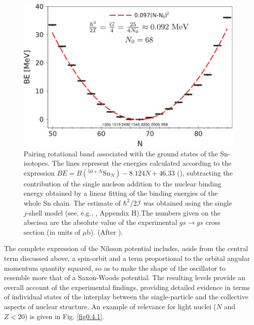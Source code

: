 \documentclass[a4paper,11pt]{book}
\numberwithin{equation}{section}
\numberwithin{figure}{section}
\numberwithin{table}{section}
\begin{document}
\begin{figure}
	\centerline {
		\includegraphics*[width=12cm, angle=0.]{introduccion/figs/fig0_4_5_v2}
	}
	\caption{Pairing rotational band associated with the ground states of the Sn-isotopes. The lines represent the energies calculated according to the expression $BE = B( ^{50+N}\text{Sn}_N ) - 8.124N + 46.33$ (\cite{Brink:05}), subtracting the contribution of the single nucleon addition to the nuclear binding		energy obtained by a linear fitting of the binding energies of the whole Sn chain. The estimate of $\hbar^2/2\mathcal I$ was obtained using the single $j$-shell model (see, e.g., \cite{Brink:05}, Appendix H).The numbers given on the abscissa are the absolute value of the experimental $gs\to gs$ cross section (in units of $\mu $b). (After \cite{Potel:13b}).}
	\label{fig0.4.5}
\end{figure}
The complete expression of the Nilsson potential includes, aside from the central term discussed above, a spin-orbit and a term proportional to the orbital angular momentum quantity squared, so as to make the shape of the oscillator to resemble more that of a Saxon-Woods potential. The resulting levels provide an overall account of the experimental findings, providing detailed evidence in terms of individual states of the interplay between the single-particle and the collective aspects of nuclear structure. An example of relevance for light nuclei ($N$ and $Z<20$) is given in Fig. \ref{fig0.4.1}.
\end{document}
